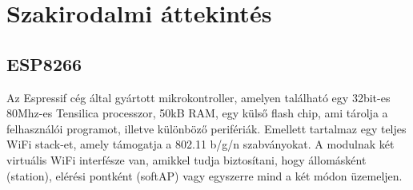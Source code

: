 



\chapter{Szakirodalmi áttekintés}
\section{ESP8266}
Az Espressif cég által gyártott mikrokontroller, amelyen található egy 32bit-es 80Mhz-es Tensilica processzor, 50kB RAM, egy külső flash chip, ami tárolja a felhasználói programot, illetve különböző perifériák. Emellett tartalmaz egy teljes WiFi stack-et, amely támogatja a 802.11 b/g/n szabványokat. A modulnak két virtuális WiFi interfésze van, amikkel tudja biztosítani, hogy állomásként (station), elérési pontként (softAP) vagy egyszerre mind a két módon üzemeljen. 

